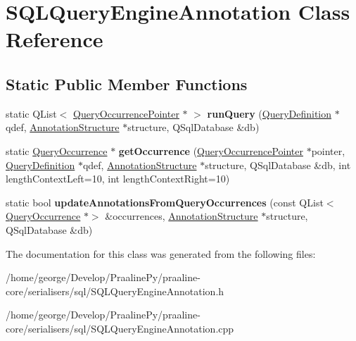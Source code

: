 \hypertarget{class_s_q_l_query_engine_annotation}{}\section{S\+Q\+L\+Query\+Engine\+Annotation Class Reference}
\label{class_s_q_l_query_engine_annotation}
\subsection*{Static Public Member Functions}
\begin{DoxyCompactItemize}
\item 
\mbox{\label{class_s_q_l_query_engine_annotation_aafb9c6dc8dfc6f7709cfe1bc4d87e6c5}} 
static Q\+List$<$ \hyperlink{struct_query_occurrence_pointer}{Query\+Occurrence\+Pointer} $\ast$ $>$ {\bfseries run\+Query} (\hyperlink{class_query_definition}{Query\+Definition} $\ast$qdef, \hyperlink{class_annotation_structure}{Annotation\+Structure} $\ast$structure, Q\+Sql\+Database \&db)
\item 
\mbox{\label{class_s_q_l_query_engine_annotation_a4125cbbf106e2eb3eac7c92723880f2e}} 
static \hyperlink{class_query_occurrence}{Query\+Occurrence} $\ast$ {\bfseries get\+Occurrence} (\hyperlink{struct_query_occurrence_pointer}{Query\+Occurrence\+Pointer} $\ast$pointer, \hyperlink{class_query_definition}{Query\+Definition} $\ast$qdef, \hyperlink{class_annotation_structure}{Annotation\+Structure} $\ast$structure, Q\+Sql\+Database \&db, int length\+Context\+Left=10, int length\+Context\+Right=10)
\item 
\mbox{\label{class_s_q_l_query_engine_annotation_a3d3cdfcc04178f310878c1eceaa74899}} 
static bool {\bfseries update\+Annotations\+From\+Query\+Occurrences} (const Q\+List$<$ \hyperlink{class_query_occurrence}{Query\+Occurrence} $\ast$$>$ \&occurrences, \hyperlink{class_annotation_structure}{Annotation\+Structure} $\ast$structure, Q\+Sql\+Database \&db)
\end{DoxyCompactItemize}


The documentation for this class was generated from the following files\+:\begin{DoxyCompactItemize}
\item 
/home/george/\+Develop/\+Praaline\+Py/praaline-\/core/serialisers/sql/S\+Q\+L\+Query\+Engine\+Annotation.\+h\item 
/home/george/\+Develop/\+Praaline\+Py/praaline-\/core/serialisers/sql/S\+Q\+L\+Query\+Engine\+Annotation.\+cpp\end{DoxyCompactItemize}
